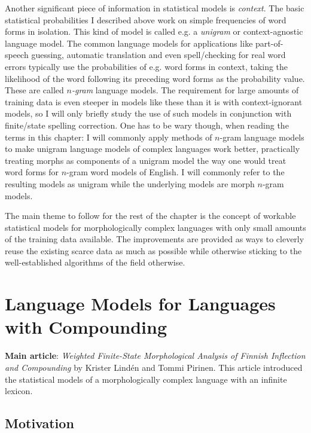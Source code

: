 \documentclass[officiallayout,final]{unihelcompling}
\begin{document}
Another significant piece of information in statistical models is
\emph{context}. The basic statistical probabilities I described above work on
simple frequencies of word forms in isolation. This kind of model is called
e.g. a \emph{unigram} or context-agnostic language model. The common language
models for applications like part-of-speech guessing, automatic translation and
even spell\-/checking for real word errors typically use the probabilities of
e.g.  word forms in context, taking the likelihood of the word following its
preceding word forms as the probability value.  These are called
\emph{\(n\)-gram} language models.  The requirement for large amounts of
training data is even steeper in models like these than it is with
context-ignorant models, so I will only briefly study the use of such models in
conjunction with finite\-/state spelling correction. One has to be wary though,
when reading the terms in this chapter: I will commonly apply methods
of \(n\)-gram language models to make unigram language models of complex
languages work better, practically treating morphs as
components of a unigram model the way one would treat word forms for
\(n\)-gram word models of English. I will commonly refer to the resulting
models as unigram while the underlying models are morph \(n\)-gram models.

The main theme to follow for the rest of the chapter is the concept of workable
statistical models for morphologically complex languages with only small
amounts of the training data available. The improvements are provided as ways
to cleverly reuse the existing scarce data as much as possible while otherwise
sticking to the well-established algorithms of the field otherwise.

\section{Language Models for Languages with Compounding}
\label{sec:compounding}

\textbf{Main article}: \emph{Weighted Finite-State Morphological Analysis of
Finnish Inflection and Compounding}  by Krister
Lindén and Tommi Pirinen. This article introduced the statistical models of a
morphologically complex language with an infinite lexicon.

\subsection{Motivation}
\end{document}
